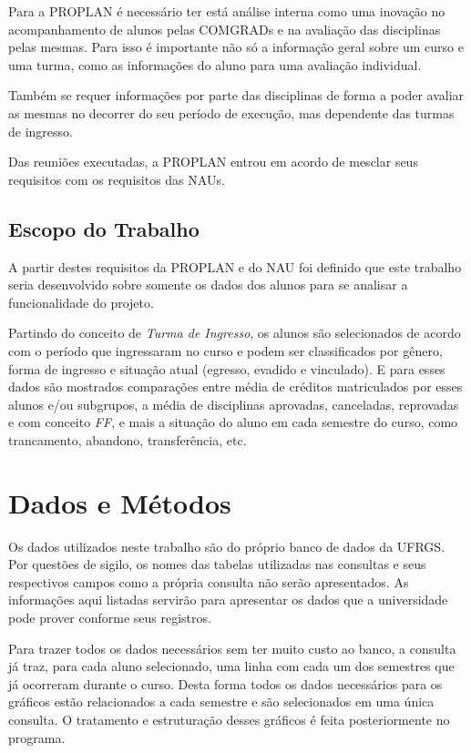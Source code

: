 \documentclass[cic,tc]{iiufrgs}
\begin{document}
Para a PROPLAN é necessário ter está análise interna como uma inovação no acompanhamento de alunos pelas COMGRADs e na avaliação das disciplinas pelas mesmas. Para isso é importante não só a informação geral sobre um curso e uma turma, como as informações do aluno para uma avaliação individual.

Também se requer informações por parte das disciplinas de forma a poder avaliar as mesmas no decorrer do seu período de execução, mas dependente das turmas de ingresso.

Das reuniões executadas, a PROPLAN entrou em acordo de mesclar seus requisitos com os requisitos das NAUs.

\section{Escopo do Trabalho}
A partir destes requisitos da PROPLAN e do NAU foi definido que este trabalho seria desenvolvido sobre somente os dados dos alunos para se analisar a funcionalidade do projeto.

Partindo do conceito de \textit{Turma de Ingresso}, os alunos são selecionados de acordo com o período que ingressaram no curso e podem ser classificados por gênero, forma de ingresso e situação atual (egresso, evadido e vinculado). E para esses dados são mostrados comparações entre média de créditos matriculados por esses alunos e/ou subgrupos, a média de disciplinas aprovadas, canceladas, reprovadas e com conceito \textit{FF}, e mais a situação do aluno em cada semestre do curso, como trancamento, abandono, transferência, etc.

\chapter{Dados e Métodos}\label{cap_3_trabs_rel}

Os dados utilizados neste trabalho são do próprio banco de dados da UFRGS. Por questões de sigilo, os nomes das tabelas utilizadas nas consultas e seus respectivos campos como a própria consulta não serão apresentados. As informações aqui listadas servirão para apresentar os dados que a universidade pode prover conforme seus registros.

Para trazer todos os dados necessários sem ter muito custo ao banco, a consulta já traz, para cada aluno selecionado, uma linha com cada um dos semestres que já ocorreram durante o curso. Desta forma todos os dados necessários para os gráficos estão relacionados a cada semestre e são selecionados em uma única consulta. O tratamento e estruturação desses gráficos é feita posteriormente no programa.
\end{document}
